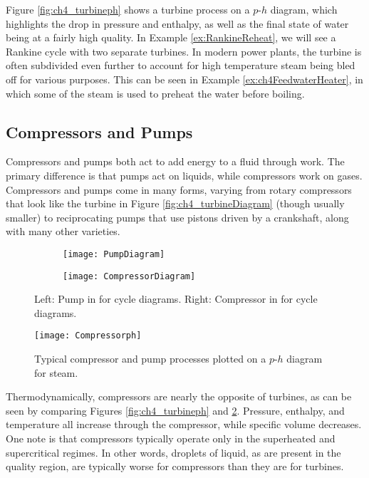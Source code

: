 Figure \ref{fig:ch4_turbineph} shows a turbine process on a $p$-$h$ diagram, which highlights the drop in pressure and enthalpy, as well as the final state of water being at a fairly high quality.  In Example \ref{ex:RankineReheat}, we will see a Rankine cycle with two separate turbines.  In modern power plants, the turbine is often subdivided even further to account for high temperature steam being bled off for various purposes.  This can be seen in Example \ref{ex:ch4FeedwaterHeater}, in which some of the steam is used to preheat the water before boiling.

\subsection{Compressors and Pumps} \label{sec:ch4_pumps}

Compressors and pumps both act to add energy to a fluid through work.  The primary difference is that pumps act on liquids, while compressors work on gases.  Compressors and pumps come in many forms, varying from rotary compressors that look like the turbine in Figure \ref{fig:ch4_turbineDiagram} (though usually smaller) to reciprocating pumps that use pistons driven by a crankshaft, along with many other varieties.


\begin{figure}[H]
  \centering
  \begin{subfigure}[b]{0.3\textwidth}
    \centering
    \texttt{[image: PumpDiagram]}
   
  \end{subfigure}
  \hspace{1 in}
  \begin{subfigure}[b]{0.3\textwidth}
    \centering
    \texttt{[image: CompressorDiagram]}
  \end{subfigure}
   \caption{Left: Pump in for cycle diagrams. Right: Compressor in for cycle diagrams.}
\label{fig:ch4_compressorDiagram}
\end{figure}

\begin{figure}[H]
\centering
\texttt{[image: Compressorph]}
\caption{Typical compressor and pump processes plotted on a $p$-$h$ diagram for steam.}
\label{fig:ch4_compressorph}
\end{figure}

Thermodynamically, compressors are nearly the opposite of turbines, as can be seen by comparing Figures \ref{fig:ch4_turbineph} and \ref{fig:ch4_compressorph}.  Pressure, enthalpy, and temperature all increase through the compressor, while specific volume decreases.  One note is that compressors typically operate only in the superheated and supercritical regimes.  In other words, droplets of liquid, as are present in the quality region, are typically worse for compressors than they are for turbines.


